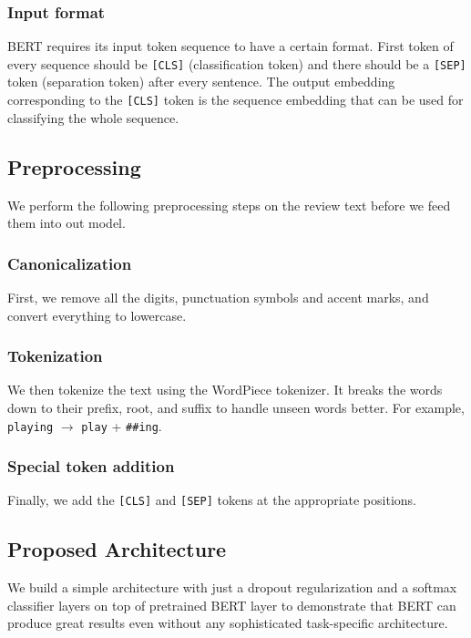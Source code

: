 \documentclass[conference]{IEEEtran}
\begin{document}
\subsubsection{Input format}

BERT requires its input token sequence to have a certain format. First token of every sequence should be {\tt [CLS]} (classification token) and there should be a {\tt [SEP]} token (separation token) after every sentence. The output embedding corresponding to the {\tt [CLS]} token is the sequence embedding that can be used for classifying the whole sequence.

\subsection{Preprocessing}

We perform the following preprocessing steps on the review text before we feed them into out model.

\subsubsection{Canonicalization} First, we remove all the digits, punctuation symbols and accent marks, and convert everything to lowercase.

\subsubsection{Tokenization} We then tokenize the text using the WordPiece tokenizer\cite{wordpiece}. It breaks the words down to their prefix, root, and suffix to handle unseen words better. For example, {\tt playing} $\rightarrow$ {\tt play} + {\tt \#\#ing}.

\subsubsection{Special token addition} Finally, we add the {\tt [CLS]} and {\tt [SEP]} tokens at the appropriate positions.

\subsection{Proposed Architecture}

We build a simple architecture with just a dropout regularization\cite{dropout} and a softmax classifier layers on top of pretrained BERT layer to demonstrate that BERT can produce great results even without any sophisticated task-specific architecture.
\end{document}
